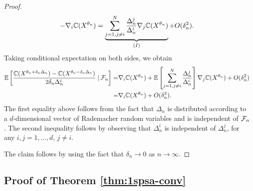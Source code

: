 \documentclass{article}
\numberwithin{equation}{section}
\numberwithin{theorem}{section}
\begin{document}
\begin{proof}
\begin{align*}
- \nabla_i \mathbb{C}(X^{\theta_n})
=\underbrace{\sum_{j=1,j\not=i}^{N} \frac{\Delta_n^j}{\Delta_n^i}\nabla_j \mathbb{C}(X^{\theta_n})}_{(I)} + O(\delta_n^2).
\end{align*}
Taking conditional expectation on both sides, we obtain
\begin{align}
\mathbb{E}\left[\dfrac{\mathbb{C}(X^{\theta_n + \delta_n \Delta_n}) - \mathbb{C}(X^{\theta_n - \delta_n \Delta_n})}{2 \delta_n \Delta_n^i} \left.\right| \mathcal{F}_n\right] 
=& \nabla_i \mathbb{C}(X^{\theta_n}) + \mathbb{E}\left[\sum_{j=1,j\not=i}^{N} \frac{\Delta_n^j}{\Delta_n^i}\right]\nabla_j \mathbb{C}(X^{\theta_n}) + O(\delta_n^2)\nonumber\\
= & \nabla_i \mathbb{C}(X^{\theta_n}) + O(\delta_n^2).\label{eq:l2}
\end{align}
The first equality above follows from the fact that $\Delta_n$ is distributed according to a $d$-dimensional vector of Rademacher random variables and is independent of $\mathcal{F}_n$. The second inequality follows by observing that $\Delta_n^i$ is independent of $\Delta_n^j$, for any $i,j =1,\ldots,d$, $j\ne i$. 

The claim follows by using the fact that $\delta_n \rightarrow 0$ as $n\rightarrow \infty$.
\end{proof}

\subsection*{Proof of Theorem \ref{thm:1spsa-conv}}
\end{document}
